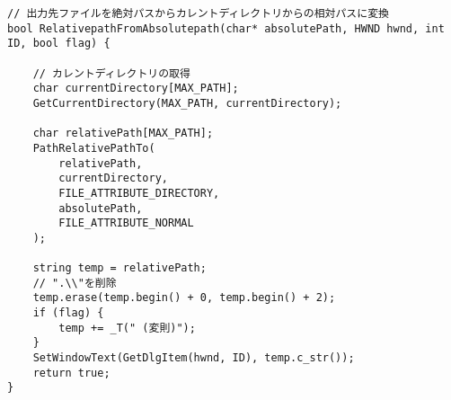 \begin{lstlisting}[caption=file.cpp]
// 出力先ファイルを絶対パスからカレントディレクトリからの相対パスに変換
bool RelativepathFromAbsolutepath(char* absolutePath, HWND hwnd, int ID, bool flag) {

	// カレントディレクトリの取得
	char currentDirectory[MAX_PATH];
	GetCurrentDirectory(MAX_PATH, currentDirectory);

	char relativePath[MAX_PATH];
	PathRelativePathTo(
		relativePath,
		currentDirectory,
		FILE_ATTRIBUTE_DIRECTORY,
		absolutePath,
		FILE_ATTRIBUTE_NORMAL
	);

	string temp = relativePath;
	// ".\\"を削除
	temp.erase(temp.begin() + 0, temp.begin() + 2);
	if (flag) {
		temp += _T(" (変則)");
	}
	SetWindowText(GetDlgItem(hwnd, ID), temp.c_str());
	return true;
}
\end{lstlisting}

\begin{lstlisting}[caption=main.h]

\end{lstlisting}

